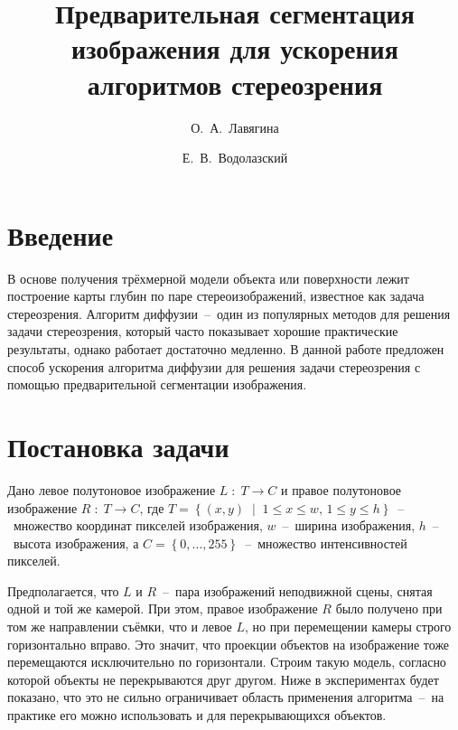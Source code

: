 \documentclass{ConfFTI}
\title{Предварительная сегментация изображения для ускорения алгоритмов стереозрения}
\author{О.~А.~Лавягина}{1} %
\author{Е.~В.~Водолазский}{2}
\affiliation{\ntuuipt}{1}
\affiliation{Международный научно-учебный центр информационных технологий и систем \\
             НАН Украины и МОН Украины}{2}
\begin{document}


\section*{Введение}

В основе получения трёхмерной
модели объекта или поверхности
лежит построение карты глубин по паре стереоизображений,
известное как задача стереозрения.
Алгоритм диффузии~--~один из популярных методов для решения задачи стереозрения,
который часто показывает хорошие практические результаты,
однако работает достаточно медленно.
В данной работе предложен способ ускорения алгоритма диффузии
для решения задачи стереозрения с помощью
предварительной сегментации изображения.

\section{Постановка задачи}

Дано левое полутоновое изображение $L \; : \; T \to C$
и правое полутоновое изображение $R \; : \; T \to C$,
где
$T = \left\{
    \left(x, y \right) \; \middle| \;
    1 \le x \le w, \,
    1 \le y \le h
\right\}$~--~множество координат пикселей изображения,
$w$~--~ширина изображения, $h$~--~высота изображения,
а $C= \left\{ 0, \dotsc, 255 \right\}$~--~множество интенсивностей пикселей.

Предполагается, что $L$ и $R$~--~пара изображений неподвижной сцены,
снятая одной и той же камерой.
При этом, правое изображение $R$ было получено при том же направлении съёмки,
что и левое $L$,
но при перемещении камеры строго горизонтально вправо.
Это значит,
что проекции объектов
на изображение тоже перемещаются исключительно по горизонтали.
Строим такую модель, согласно которой объекты не перекрываются друг другом.
Ниже в экспериментах будет показано,
что это не сильно ограничивает область
применения алгоритма~--~на практике его
можно использовать и для перекрывающихся объектов.
\end{document}

